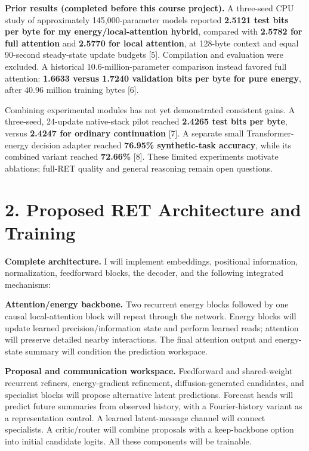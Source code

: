 \documentclass[11pt,letterpaper]{article}
\begin{document}
\textbf{Prior results (completed before this course project).} A three-seed CPU study of approximately 145,000-parameter models reported \textbf{2.5121 test bits per byte for my energy/local-attention hybrid}, compared with \textbf{2.5782 for full attention} and \textbf{2.5770 for local attention}, at 128-byte context and equal 90-second steady-state update budgets [5]. Compilation and evaluation were excluded. A historical 10.6-million-parameter comparison instead favored full attention: \textbf{1.6633 versus 1.7240 validation bits per byte for pure energy}, after 40.96 million training bytes [6].

Combining experimental modules has not yet demonstrated consistent gains. A three-seed, 24-update native-stack pilot reached \textbf{2.4265 test bits per byte}, versus \textbf{2.4247 for ordinary continuation} [7]. A separate small Transformer-energy decision adapter reached \textbf{76.95\% synthetic-task accuracy}, while its combined variant reached \textbf{72.66\%} [8]. These limited experiments motivate ablations; full-RET quality and general reasoning remain open questions.

\newpage
\section*{2. Proposed RET Architecture and Training}

\textbf{Complete architecture.} I will implement embeddings, positional information, normalization, feedforward blocks, the decoder, and the following integrated mechanisms:

\textbf{Attention/energy backbone.} Two recurrent energy blocks followed by one causal local-attention block will repeat through the network. Energy blocks will update learned precision/information state and perform learned reads; attention will preserve detailed nearby interactions. The final attention output and energy-state summary will condition the prediction workspace.

\textbf{Proposal and communication workspace.} Feedforward and shared-weight recurrent refiners, energy-gradient refinement, diffusion-generated candidates, and specialist blocks will propose alternative latent predictions. Forecast heads will predict future summaries from observed history, with a Fourier-history variant as a representation control. A learned latent-message channel will connect specialists. A critic/router will combine proposals with a keep-backbone option into initial candidate logits. All these components will be trainable.
\end{document}
